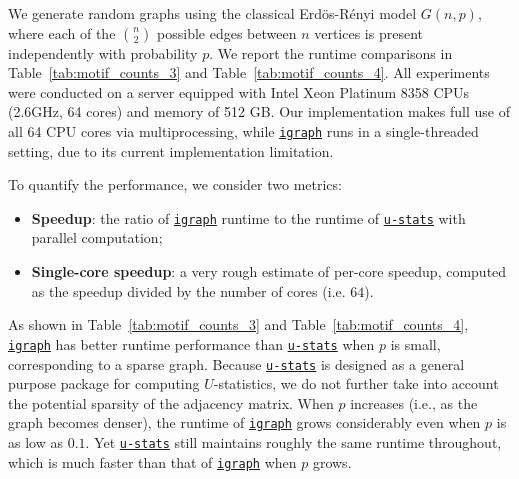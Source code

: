\documentclass[twoside,11pt]{article}
\newcommand{\libref}[2]{\href{#2}{\texttt{#1}}}
\def\package{\libref{u-stats}{https://github.com/zrq1706/U-Statistics-python}}
\def\igraph{\libref{igraph}{https://igraph.org/}}
\begin{document}
We generate random graphs using the classical Erd\"{o}s-R\'{e}nyi model $G (n, p)$, where each of the $\binom{n}{2}$ possible edges between $n$ vertices is present independently with probability $p$. We report the runtime comparisons in Table~\ref{tab:motif_counts_3} and Table~\ref{tab:motif_counts_4}. All experiments were conducted on a server equipped with Intel Xeon Platinum 8358 CPUs (2.6GHz, 64 cores) and memory of 512 GB. Our implementation makes full use of all 64 CPU cores via multiprocessing, while \igraph{} runs in a single-threaded setting, due to its current implementation limitation. 

To quantify the performance, we consider two metrics:
\begin{itemize}
\item \textbf{Speedup}: the ratio of \igraph{} runtime to the runtime of \package{} with parallel computation;
\item \textbf{Single-core speedup}: a very rough estimate of per-core speedup, computed as the speedup divided by the number of cores (i.e. $64$).
\end{itemize}

As shown in Table~\ref{tab:motif_counts_3} and Table~\ref{tab:motif_counts_4}, \igraph{} has better runtime performance than \package{} when $p$ is small, corresponding to a sparse graph. Because \package{} is designed as a general purpose package for computing $U$-statistics, we do not further take into account the potential sparsity of the adjacency matrix. When $p$ increases (i.e., as the graph becomes denser), the runtime of \igraph{} grows considerably even when $p$ is as low as $0.1$. Yet \package{} still maintains roughly the same runtime throughout, which is much faster than that of \igraph{} when $p$ grows.
\end{document}
